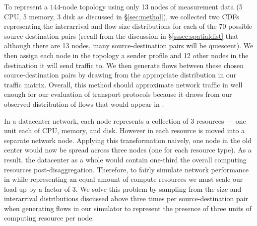 To represent a $144$-node topology using only 13 nodes of measurement data (5 CPU, 5 memory, 3 disk as discussed in \S\ref{sec:methol}), we collected two CDFs representing the interarrival and flow size distributions for each of the 70 possible source-destination pairs (recall from the discussion in \S\ref{sssec:spatialdist} that although there are 13 nodes, many source-destination pairs will be quiescent). We then assign each node in the topology a sender profile and 12 other nodes in the destination it will send traffic to. We then generate flows between these chosen source-destination pairs by drawing from the appropriate distribution in our traffic matrix. Overall, this method should approximate network traffic in \dis well enough for our evaluation of transport protocols because it draws from our observed distribution of flows that would appear in \dis.

In a \pdis datacenter network, each node represents a collection of 3 resources --- one unit each of CPU, memory, and disk. However in \dis each resource is moved into a separate network node. Applying this transformation naively, one node in the old center would now be spread across three nodes (one for each resource type). As a result, the datacenter as a whole would contain one-third the overall computing resources post-disaggregation. Therefore, to fairly simulate network performance in \dis while representing an equal amount of compute resources we must scale our load up by a factor of 3. We solve this problem by sampling from the size and interarrival distributions discussed above three times per source-destination pair when generating flows in our simulator to represent the presence of three units of computing resource per node.

